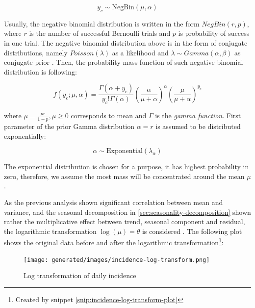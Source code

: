\documentclass[
  digital, %
  oneside, %
  lof,     %
  lot,     %
]{fithesis4}
\begin{document}
\begin{equation}
y_c \sim \text{NegBin}\left( \mu, \alpha \right)
\end{equation}

Usually, the negative binomial distribution is 
written in the form $NegBin \left( r, p \right)$, 
where $r$ is the number of successful Bernoulli 
trials and $p$ is probability of success in one 
trial. The negative binomial distribution above 
is in the form of conjugate distributions, namely 
$Poisson\left( \lambda \right)$ as a likelihood 
and $\lambda \sim Gamma\left( \alpha, \beta \right)$ as 
conjugate prior \cite{munezero2020}. 
Then, the probability mass function of such 
negative binomial distribution is following:

\begin{equation}
f \left( y_c; \mu, \alpha \right) = \frac{\Gamma \left( \alpha + y_c \right) }{y_c! \Gamma \left( \alpha \right)} \left( \frac{\alpha}{\mu + \alpha} \right)^{\alpha} \left( \frac{\mu}{\mu + \alpha} \right)^{y_c}
\end{equation}

where $\mu = \frac{pr}{1-p}, \mu \geq 0$ corresponds to mean and 
$\Gamma$ is the \textit{gamma function}. 
First parameter of the prior Gamma distribution 
$\alpha = r$ is assumed to be distributed exponentially:

\begin{equation}\label{eq:alpha-prior}
	\alpha \sim \text{Exponential} \left( \lambda_{\alpha} \right)
\end{equation}

The exponential distribution is chosen for a purpose,
it has highest probability in zero, therefore, we assume the most
mass will be concentrated around the mean $\mu$.

As the previous analysis shown significant 
correlation between mean and variance, and the seasonal decomposition 
in \autoref{sec:seasonality-decomposition} shown rather the 
multiplicative effect between trend, seasonal component and residual, the 
logarithmic transformation $\log \left( \mu \right) = \theta$ is considered \cite{cialdella2020}.
The following plot shows the original data 
before and after the logarithmic transformation\footnote{Created by snippet \ref{snip:incidence-log-transform-plot}}:

\begin{figure}[H]
  \begin{center}
    \texttt{[image: generated/images/incidence-log-transform.png]}
  \end{center}
  \caption{Log transformation of daily incidence}
  \label{fig:incidence-log-transform}
\end{figure}
\end{document}
